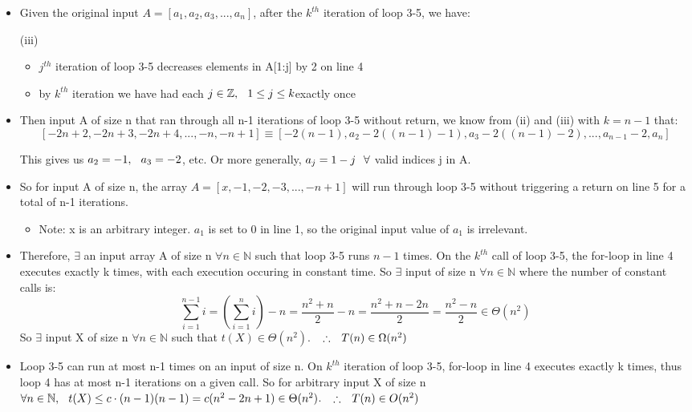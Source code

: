 \documentclass[12pt, oneside]{article}
\newcommand\tab[1][0.25cm]{\hspace*{#1}}
\newcommand\thfr{\tab \therefore \tab}
\begin{document}
\begin{itemize}
\item Given the original input $A = [a_1, a_2, a_3, ..., a_n]$, after the $k^{th}$ iteration of loop 3-5, we have:
	\begin{center} (iii)  \end{center}
	\begin{itemize}
	\item $j^{th}$ iteration of loop 3-5 decreases elements in A[1:j] by 2 on line 4
	\item by $k^{th}$ iteration we have had each $j\in\mathbb{Z}, \tab 1\leq j \leq k$\tab exactly once
	\end{itemize}
	
\item Then input A of size n that ran through all n-1 iterations of loop 3-5 without return, we know from (ii) and (iii) with $k = n-1$ that:
	$$ [-2n+2, -2n+3, -2n+4, ..., -n, -n+1] \equiv [-2(n-1), a_2-2((n-1)-1), a_3-2((n-1)-2), ..., a_{n-1}-2, a_n]$$
	\newpage
	
	This gives us $a_2 = -1,\tab a_3 = -2$, etc. Or more generally, $a_j  = 1-j \tab \forall$ valid indices j in A.

\item So for input A of size n, the array $A = [x, -1, -2, -3, ... , -n+1]$ will run through loop 3-5 without triggering a return on line 5 for a total of n-1 iterations.
	\begin{itemize}
	\item Note: x is an arbitrary integer. $a_1$ is set to 0 in line 1, so the original input value of $a_1$ is irrelevant.
	\end{itemize}

\item Therefore, $\exists$ an input array A of size n $\forall n \in \mathbb{N}$ such that loop 3-5 runs $n-1$ times. \newline
	On the $k^{th}$ call of loop 3-5, the for-loop in line 4 executes exactly k times, with each execution occuring in constant time.\newline
	So $\exists$ input of size n $\forall n \in \mathbb{N}$ where the number of constant calls is:
	$$\sum_{i=1}^{n-1} i = (\sum_{i=1}^{n} i )-n = \frac{n^2+n}{2}-n = \frac{n^2+n-2n}{2} = \frac{n^2-n}{2} \in \Theta(n^2)$$\newline
	So $\exists$ input X of size n $\forall n \in \mathbb{N}$ such that $t(X) \in \Theta(n^2)$. $\thfr T(n) \in \Omega(n^2)$

\item Loop 3-5 can run at most n-1 times on an input of size n. \newline
	On $k^{th}$ iteration of loop 3-5, for-loop in line 4 executes exactly k times, thus loop 4 has at most n-1 iterations on a given call. \newline
	So for arbitrary input X of size n $\forall n \in \mathbb{N}, \tab t(X) \leq c\cdot(n-1)(n-1) = c(n^2-2n+1) \in \Theta(n^2)$. \newline
	$\thfr T(n) \in O(n^2)$
\end{itemize}
\end{document}
